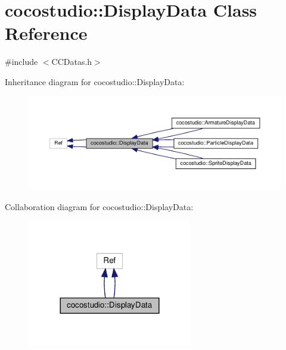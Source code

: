 \hypertarget{classcocostudio_1_1DisplayData}{}\section{cocostudio\+:\+:Display\+Data Class Reference}
\label{classcocostudio_1_1DisplayData}


{\ttfamily \#include $<$C\+C\+Datas.\+h$>$}



Inheritance diagram for cocostudio\+:\+:Display\+Data\+:
\nopagebreak
\begin{figure}[H]
\begin{center}
\leavevmode
\includegraphics[width=350pt]{classcocostudio_1_1DisplayData__inherit__graph}
\end{center}
\end{figure}


Collaboration diagram for cocostudio\+:\+:Display\+Data\+:
\nopagebreak
\begin{figure}[H]
\begin{center}
\leavevmode
\includegraphics[width=204pt]{classcocostudio_1_1DisplayData__coll__graph}
\end{center}
\end{figure}
